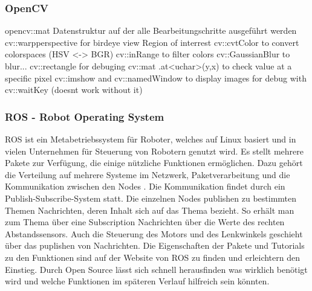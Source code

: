\subsubsection{OpenCV}
\label{sec:openCV}
opencv::mat Datenstruktur auf der alle Bearbeitungschritte ausgeführt werden
cv::warpperspective for birdeye view
Region of interrest
cv::cvtColor to convert colorspaces (HSV <-> BGR)
cv::inRange to filter colors
cv::GaussianBlur to blur...
cv::rectangle for debuging
cv::mat .at<uchar>(y,x) to check value at a specific pixel
cv::imshow and cv::namedWindow to display images for debug with cv::waitKey (doesnt work without it)

\subsubsection{ROS - Robot Operating System}
\label{sec:ros}
ROS ist ein Metabetriebssystem für Roboter, welches auf Linux basiert und in vielen Unternehmen für Steuerung von Robotern genutzt wird. Es stellt mehrere Pakete zur Verfügung, die einige nützliche Funktionen ermöglichen. Dazu gehört die Verteilung auf mehrere Systeme im Netzwerk, Paketverarbeitung und die Kommunikation zwischen den Nodes \cite{einfuehrungROS}.
Die Kommunikation findet durch ein Publish-Subscribe-System statt. Die einzelnen Nodes publishen zu  bestimmten Themen Nachrichten, deren Inhalt sich auf das Thema bezieht. So erhält man zum Thema  über eine Subscription Nachrichten über die Werte des rechten Abstandssensors. Auch die Steuerung des Motors und des Lenkwinkels geschieht über das puplishen von Nachrichten. 
Die Eigenschaften der Pakete und Tutorials zu den Funktionen sind auf der Website von ROS zu finden und erleichtern den Einstieg. Durch Open Source lässt sich schnell herausfinden was wirklich benötigt wird und welche Funktionen im späteren Verlauf hilfreich sein könnten.

